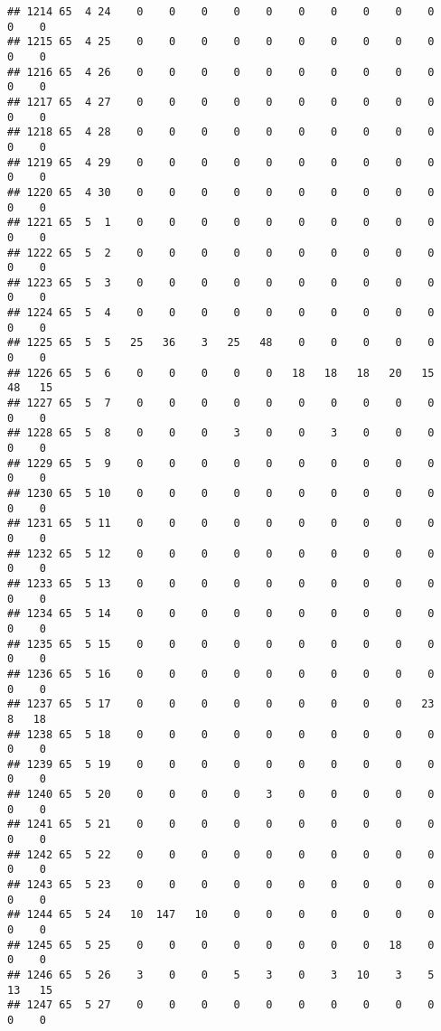 \documentclass[]{article}
\begin{document}
\begin{verbatim}
## 1214 65  4 24    0    0    0    0    0    0    0    0    0    0    0    0
## 1215 65  4 25    0    0    0    0    0    0    0    0    0    0    0    0
## 1216 65  4 26    0    0    0    0    0    0    0    0    0    0    0    0
## 1217 65  4 27    0    0    0    0    0    0    0    0    0    0    0    0
## 1218 65  4 28    0    0    0    0    0    0    0    0    0    0    0    0
## 1219 65  4 29    0    0    0    0    0    0    0    0    0    0    0    0
## 1220 65  4 30    0    0    0    0    0    0    0    0    0    0    0    0
## 1221 65  5  1    0    0    0    0    0    0    0    0    0    0    0    0
## 1222 65  5  2    0    0    0    0    0    0    0    0    0    0    0    0
## 1223 65  5  3    0    0    0    0    0    0    0    0    0    0    0    0
## 1224 65  5  4    0    0    0    0    0    0    0    0    0    0    0    0
## 1225 65  5  5   25   36    3   25   48    0    0    0    0    0    0    0
## 1226 65  5  6    0    0    0    0    0   18   18   18   20   15   48   15
## 1227 65  5  7    0    0    0    0    0    0    0    0    0    0    0    0
## 1228 65  5  8    0    0    0    3    0    0    3    0    0    0    0    0
## 1229 65  5  9    0    0    0    0    0    0    0    0    0    0    0    0
## 1230 65  5 10    0    0    0    0    0    0    0    0    0    0    0    0
## 1231 65  5 11    0    0    0    0    0    0    0    0    0    0    0    0
## 1232 65  5 12    0    0    0    0    0    0    0    0    0    0    0    0
## 1233 65  5 13    0    0    0    0    0    0    0    0    0    0    0    0
## 1234 65  5 14    0    0    0    0    0    0    0    0    0    0    0    0
## 1235 65  5 15    0    0    0    0    0    0    0    0    0    0    0    0
## 1236 65  5 16    0    0    0    0    0    0    0    0    0    0    0    0
## 1237 65  5 17    0    0    0    0    0    0    0    0    0   23    8   18
## 1238 65  5 18    0    0    0    0    0    0    0    0    0    0    0    0
## 1239 65  5 19    0    0    0    0    0    0    0    0    0    0    0    0
## 1240 65  5 20    0    0    0    0    3    0    0    0    0    0    0    0
## 1241 65  5 21    0    0    0    0    0    0    0    0    0    0    0    0
## 1242 65  5 22    0    0    0    0    0    0    0    0    0    0    0    0
## 1243 65  5 23    0    0    0    0    0    0    0    0    0    0    0    0
## 1244 65  5 24   10  147   10    0    0    0    0    0    0    0    0    0
## 1245 65  5 25    0    0    0    0    0    0    0    0   18    0    0    0
## 1246 65  5 26    3    0    0    5    3    0    3   10    3    5   13   15
## 1247 65  5 27    0    0    0    0    0    0    0    0    0    0    0    0

\end{verbatim}
\end{document}
